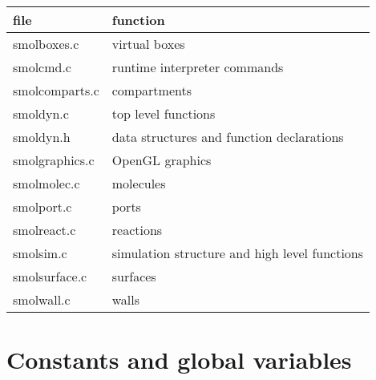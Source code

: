 \documentclass {scrbook}
\begin{document}
\begin{longtable}[c]{ll}
file & function\\
\hline
smolboxes.c & virtual boxes\\
smolcmd.c & runtime interpreter commands\\
smolcomparts.c & compartments\\
smoldyn.c & top level functions\\
smoldyn.h & data structures and function declarations\\
smolgraphics.c & OpenGL graphics\\
smolmolec.c & molecules\\
smolport.c & ports\\
smolreact.c & reactions\\
smolsim.c & simulation structure and high level functions\\
smolsurface.c & surfaces\\
smolwall.c & walls\\
\end{longtable}

\section{Constants and global variables}
\end{document}
